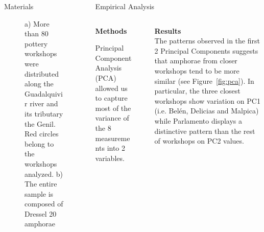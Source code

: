 \documentclass[final]{beamer}
\newcommand{\memo}[2]{\textcolor{#1}{#2}}
\newcommand{\xavi}[1]{\memo{orange}{#1\\}}
\newlength{\sepwid}
\newlength{\onecolwid}
\newlength{\twocolwid}
\begin{document}
\begin{frame}[t]
\begin{columns}[t]
\begin{column}{\onecolwid}
\begin{block}{Materials}
\begin{figure}
\singlespace
\caption{a) More than 80 pottery workshops were distributed along the Guadalquivir river and its tributary the Genil. Red circles belong to the workshops analyzed. b) The entire sample is composed of Dressel 20 amphorae}
\label{fig:betica}
\end{figure}


 \end{block}
\end{column} %

\begin{column}{\twocolwid}


\begin{block}{Empirical Analysis}

\begin{columns}[t,totalwidth=\twocolwid]
\begin{column}{\onecolwid} %


{\textbf{Methods}} 
\justify

Principal Component Analysis (PCA) allowed us to capture most of the variance of the 8 measurements into 2 variables. 



\end{column}

\begin{column}{\sepwid}\end{column} %

\begin{column}{\onecolwid} %

{\textbf{Results}}\\
\justify
The patterns observed in the first 2 Principal Components suggests that amphorae from closer workshops tend to be more similar (see Figure~\ref{fig:pca}). In particular, the three closest workshops show variation on PC1 (i.e. Bel\'en, Delicias and Malpica) while Parlamento displays a distinctive pattern than the rest of workshops on PC2 values.


\end{column}
\end{columns}


\end{block}
\end{column}
\end{columns}
\end{frame}
\end{document}
